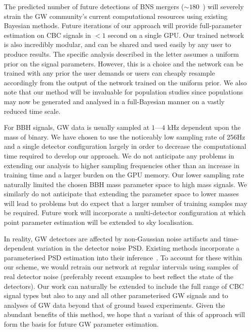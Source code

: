 \documentclass[%
showpacs,
 amsmath,amssymb,
 aps,
 twocolumn,
 prl,
 reprint,
floatfix,
]{revtex4-1}
\begin{document}
%
%
The predicted number of future detections of \ac{BNS} mergers ($\sim
180$~\cite{1304.0670,1811.12907}) will severely strain the \ac{GW} community's
current computational resources using existing Bayesian methods. Future
iterations of our approach will provide full-parameter estimation on \ac{CBC}
signals in $<1$ second on a single \ac{GPU}. Our trained network is also
incredibly modular, and can be shared and used easily by any user to produce
results. The specific analysis described in the letter assumes a uniform prior
on the signal parameters. However, this is a choice and the network can be
trained with any prior the user demands or users can cheaply resample
accordingly from the output of the network trained on the uniform prior. We
also note that our method will be invaluable for population studies since
populations may now be generated and analysed in a full-Bayesian manner on a
vastly reduced time scale. 

%
%
For \ac{BBH} signals, \ac{GW} data is usually sampled at $1$---$4$ kHz
dependent upon the mass of binary. We have chosen to use the noticeably low
sampling rate of 256Hz and a single detector configuration largely in order to
decrease the computational time required to develop our approach. We do not
anticipate any problems in extending our analysis to higher sampling
frequencies other than an increase in training time and a larger burden on the
\ac{GPU} memory. Our lower sampling rate naturally limited the chosen \ac{BBH}
mass parameter space to high mass signals. We similarly do not anticipate that
extending the parameter space to lower masses will lead to problems but do
expect that a larger number of training samples may be required. Future work
will incorporate a multi-detector configuration at which point parameter
estimation will be extended to sky localisation. 

%
%
In reality, \ac{GW} detectors are affected by non-Gaussian noise artifacts and
time-dependent variation in the detector noise \ac{PSD}. Existing methods
incorporate a parameterised \ac{PSD} estimation into their
inference~\cite{ref}. To account for these within our scheme, we would retrain
our network at regular intervals using samples of real detector noise
(preferably recent examples to best reflect the state of the detectors). Our
work can naturally be extended to include the full range of \ac{CBC} signal
types but also to any and all other parameterised \ac{GW} signals and to
analyses of \ac{GW} data beyond that of ground based experiments. Given the
abundant benefits of this method, we hope that a variant of this of approach
will form the basis for future \ac{GW} parameter estimation.
%
%
\end{document}
